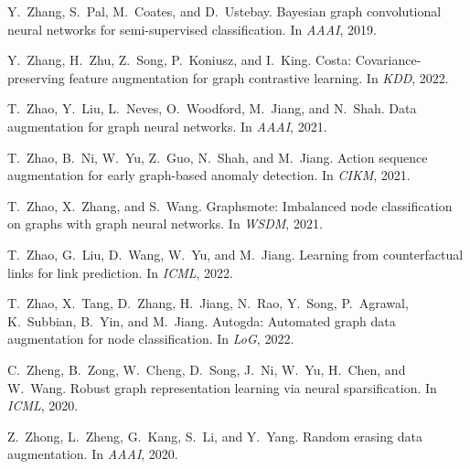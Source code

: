\documentclass[11pt]{article}
\begin{document}
\begin{thebibliography}{10}
\begin{small}
Y.~Zhang, S.~Pal, M.~Coates, and D.~Ustebay.
\newblock Bayesian graph convolutional neural networks for semi-supervised
  classification.
\newblock In \emph{AAAI}, 2019.

Y.~Zhang, H.~Zhu, Z.~Song, P.~Koniusz, and I.~King.
\newblock Costa: Covariance-preserving feature augmentation for graph
  contrastive learning.
\newblock In \emph{KDD}, 2022.

T.~Zhao, Y.~Liu, L.~Neves, O.~Woodford, M.~Jiang, and N.~Shah.
\newblock Data augmentation for graph neural networks.
\newblock In \emph{AAAI}, 2021{}.

T.~Zhao, B.~Ni, W.~Yu, Z.~Guo, N.~Shah, and M.~Jiang.
\newblock Action sequence augmentation for early graph-based anomaly detection.
\newblock In \emph{CIKM}, 2021{}.

T.~Zhao, X.~Zhang, and S.~Wang.
\newblock Graphsmote: Imbalanced node classification on graphs with graph
  neural networks.
\newblock In \emph{WSDM}, 2021{}.

T.~Zhao, G.~Liu, D.~Wang, W.~Yu, and M.~Jiang.
\newblock Learning from counterfactual links for link prediction.
\newblock In \emph{ICML}, 2022{}.

T.~Zhao, X.~Tang, D.~Zhang, H.~Jiang, N.~Rao, Y.~Song, P.~Agrawal, K.~Subbian,
  B.~Yin, and M.~Jiang.
\newblock Autogda: Automated graph data augmentation for node classification.
\newblock In \emph{LoG}, 2022{}.

C.~Zheng, B.~Zong, W.~Cheng, D.~Song, J.~Ni, W.~Yu, H.~Chen, and W.~Wang.
\newblock Robust graph representation learning via neural sparsification.
\newblock In \emph{ICML}, 2020.

Z.~Zhong, L.~Zheng, G.~Kang, S.~Li, and Y.~Yang.
\newblock Random erasing data augmentation.
\newblock In \emph{AAAI}, 2020.


\end{small}
\end{thebibliography}
\end{document}
